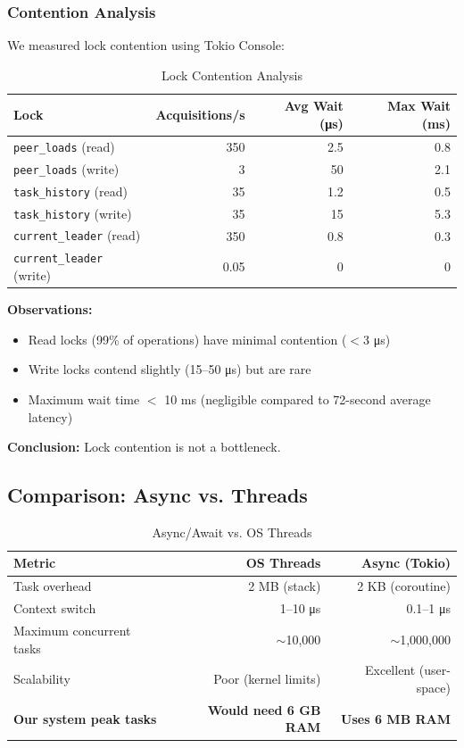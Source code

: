 \documentclass[12pt,a4paper]{article}
\begin{document}
\subsubsection{Contention Analysis}

We measured lock contention using Tokio Console:

\begin{table}[h]
\centering
\caption{Lock Contention Analysis}
\label{tab:contention}
\begin{tabular}{@{}lrrr@{}}
\toprule
\textbf{Lock} & \textbf{Acquisitions/s} & \textbf{Avg Wait (μs)} & \textbf{Max Wait (ms)} \\
\midrule
\texttt{peer\_loads} (read) & 350 & 2.5 & 0.8 \\
\texttt{peer\_loads} (write) & 3 & 50 & 2.1 \\
\texttt{task\_history} (read) & 35 & 1.2 & 0.5 \\
\texttt{task\_history} (write) & 35 & 15 & 5.3 \\
\texttt{current\_leader} (read) & 350 & 0.8 & 0.3 \\
\texttt{current\_leader} (write) & 0.05 & 0 & 0 \\
\bottomrule
\end{tabular}
\end{table}

\textbf{Observations:}
\begin{itemize}
    \item Read locks (99\% of operations) have minimal contention ($<$3 μs)
    \item Write locks contend slightly (15--50 μs) but are rare
    \item Maximum wait time $<$ 10 ms (negligible compared to 72-second average latency)
\end{itemize}

\textbf{Conclusion:} Lock contention is not a bottleneck.

\subsection{Comparison: Async vs. Threads}

\begin{table}[h]
\centering
\caption{Async/Await vs. OS Threads}
\label{tab:async-vs-threads}
\begin{tabular}{@{}lrr@{}}
\toprule
\textbf{Metric} & \textbf{OS Threads} & \textbf{Async (Tokio)} \\
\midrule
Task overhead & 2 MB (stack) & 2 KB (coroutine) \\
Context switch & 1--10 μs & 0.1--1 μs \\
Maximum concurrent tasks & $\sim$10,000 & $\sim$1,000,000 \\
Scalability & Poor (kernel limits) & Excellent (user-space) \\
\textbf{Our system peak tasks} & \textbf{Would need 6 GB RAM} & \textbf{Uses 6 MB RAM} \\
\bottomrule
\end{tabular}
\end{table}
\end{document}
